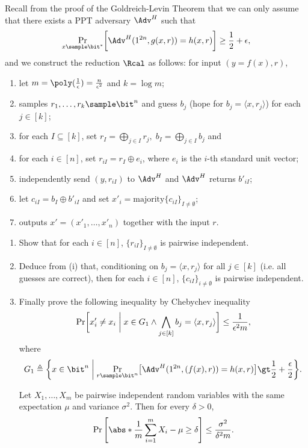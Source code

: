 \begin{problem}\label{p7}
    \leavevmode\par
    Recall from the proof of the Goldreich-Levin Theorem that we can only assume that there exists a PPT adversary $\Adv^H$ such that
    \[
        \Pr_{x\sample\bit^\ast}\biggl[  \Adv^H (1^{2n}, g(x,r))=h(x,r)\biggr] \ge \frac{1}{2}+\epsilon,
    \]
    and we construct the reduction $\Rcal$ as follows: for input $(y = f (x), r)$,
    \begin{enumerate}
        \item let $m=\poly(\frac{1}{\epsilon})=\frac{n}{\epsilon^2}$ and $k=\log m$;
        \item samples $r_1,\ldots,r_k\sample \bit^n$ and guess $b_j$ (hope for $b_j = \langle x, r_j \rangle$) for each $j\in[k]$;
        \item for each $I\subseteq [k]$, set $r_I = \bigoplus_{j\in I} r_j,\; b_I = \bigoplus_{j\in I} b_j$ and
        \item for each $i\in [n]$, set $r_{iI} = r_I \oplus e_i$, where $e_i$ is the $i$-th standard unit vector;
        \item independently send $(y, r_{iI})$ to $\Adv^H$ and $\Adv^H$ returns $b'_{iI}$;
        \item let $c_{iI} = b_I \oplus b'_{iI}$ and set $x'_i = \textrm{majority}\{c_{iI}\}_{I\neq \emptyset}$;
        \item outputs $x' = (x'_1,\ldots,x'_n)$ together with the input $r$.
    \end{enumerate}

    \begin{enumerate}[label=(\roman*)]
        \item Show that for each $i \in [n]$, $\{r_{iI}\}_{I\neq \emptyset}$ is pairwise independent.
        \item Deduce from (i) that, conditioning on $b_j = \langle x, r_j \rangle$ for all $j \in[k]$ (i.e. all guesses are correct), then for each $i \in [n]$, $\{c_{iI}\}_{i\neq\emptyset}$ is pairwise independent.
        \item Finally prove the following inequality by Chebychev inequality
        \[
            \Pr\biggl[x'_i \neq x_i \biggm\vert x\in G_1 \land \bigwedge_{j\in[k]} b_j = \langle x,r_j \rangle \biggr] \le \frac{1}{\epsilon^2 m},
        \]
        where
        \[
            G_1 \triangleq \biggl\{ x\in\bit^n \biggm\vert 
            \Pr_{r\sample \bit^n}\bigl[ \Adv^H(1^{2n}, (f(x),r)) = h(x,r)\bigr] \gt \frac{1}{2}+\frac{\epsilon}{2} \biggr\}.
        \]
        \vspace{-1cm}
        \begin{theorem*}
            Let $X_1,\ldots,X_m$ be pairwise independent random variables with the same expectation $\mu$ and variance $\sigma^2$. Then for every $\delta\gt 0$,
            \[
                \Pr\left[ \abs*{\frac{1}{m}\sum_{i=1}^m X_i - \mu}\ge \delta \right] \le \frac{\sigma^2}{\delta^2 m}.
            \]
        \end{theorem*}
    \end{enumerate}
\end{problem}


